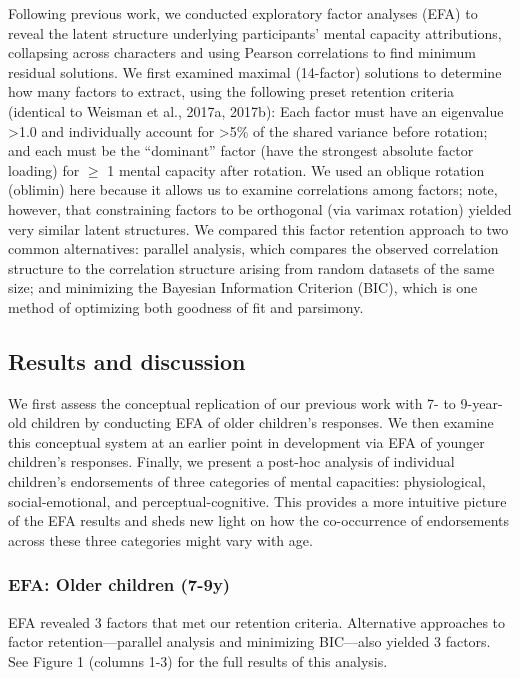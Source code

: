 \documentclass[10pt, letterpaper]{article}
\begin{document}
Following previous work, we conducted exploratory factor analyses (EFA)
to reveal the latent structure underlying participants' mental capacity
attributions, collapsing across characters and using Pearson
correlations to find minimum residual solutions. We first examined
maximal (14-factor) solutions to determine how many factors to extract,
using the following preset retention criteria (identical to Weisman et
al., 2017a, 2017b): Each factor must have an eigenvalue
\textgreater{}1.0 and individually account for \textgreater{}5\% of the
shared variance before rotation; and each must be the ``dominant''
factor (have the strongest absolute factor loading) for \(\geq\) 1
mental capacity after rotation. We used an oblique rotation (oblimin)
here because it allows us to examine correlations among factors; note,
however, that constraining factors to be orthogonal (via varimax
rotation) yielded very similar latent structures. We compared this
factor retention approach to two common alternatives: parallel analysis,
which compares the observed correlation structure to the correlation
structure arising from random datasets of the same size; and minimizing
the Bayesian Information Criterion (BIC), which is one method of
optimizing both goodness of fit and parsimony.

\subsection{Results and discussion}\label{results-and-discussion}

We first assess the conceptual replication of our previous work with 7-
to 9-year-old children by conducting EFA of older children's responses.
We then examine this conceptual system at an earlier point in
development via EFA of younger children's responses. Finally, we present
a post-hoc analysis of individual children's endorsements of three
categories of mental capacities: physiological, social-emotional, and
perceptual-cognitive. This provides a more intuitive picture of the EFA
results and sheds new light on how the co-occurrence of endorsements
across these three categories might vary with age.

\subsubsection{EFA: Older children
(7-9y)}\label{efa-older-children-7-9y}

EFA revealed 3 factors that met our retention criteria. Alternative
approaches to factor retention---parallel analysis and minimizing
BIC---also yielded 3 factors. See Figure 1 (columns 1-3) for the full
results of this analysis.
\end{document}
